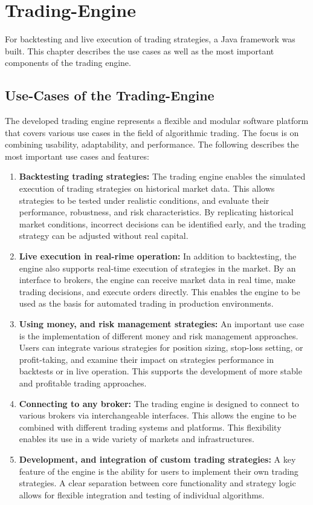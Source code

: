 \section{Trading-Engine}
\label{chap:te}

For backtesting and live execution of trading strategies, a Java framework was built.
This chapter describes the use cases as well as the most important components of the trading engine.

\subsection{Use-Cases of the Trading-Engine}
\label{chap:te-use-cases}

The developed trading engine represents a flexible and modular software platform that covers various use cases in the field of algorithmic trading.
The focus is on combining usability, adaptability, and performance.
The following describes the most important use cases and features:

\begin{enumerate}
    \item \textbf{Backtesting trading strategies:} The trading engine enables the simulated execution of trading strategies on historical market data.
    This allows strategies to be tested under realistic conditions, and evaluate their performance, robustness, and risk characteristics.
    By replicating historical market conditions, incorrect decisions can be identified early, and the trading strategy can be adjusted without real capital.
    \item \textbf{Live execution in real-rime operation:} In addition to backtesting, the engine also supports real-time execution of strategies in the market.
    By an interface to brokers, the engine can receive market data in real time, make trading decisions, and execute orders directly.
    This enables the engine to be used as the basis for automated trading in production environments.
    \item \textbf{Using money, and risk management strategies:} An important use case is the implementation of different money and risk management approaches.
    Users can integrate various strategies for position sizing, stop-loss setting, or profit-taking, and examine their impact on strategies performance in backtests or in live operation.
    This supports the development of more stable and profitable trading approaches.
    \item \textbf{Connecting to any broker:} The trading engine is designed to connect to various brokers via interchangeable interfaces.
    This allows the engine to be combined with different trading systems and platforms.
    This flexibility enables its use in a wide variety of markets and infrastructures.
    \item \textbf{Development, and integration of custom trading strategies:} A key feature of the engine is the ability for users to implement their own trading strategies.
    A clear separation between core functionality and strategy logic allows for flexible integration and testing of individual algorithms.
\end{enumerate}

